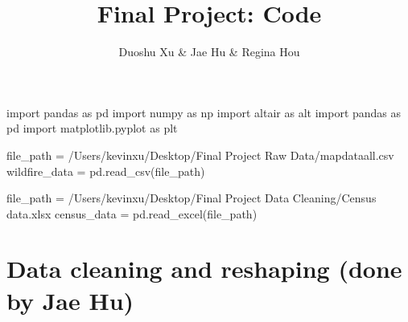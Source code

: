 \documentclass[
  letterpaper,
  DIV=11,
  numbers=noendperiod]{scrartcl}
\title{Final Project: Code}
\author{Duoshu Xu \& Jae Hu \& Regina Hou}
\date{}
\newenvironment{Shaded}{\begin{snugshade}}{\end{snugshade}}
\newcommand{\ImportTok}[1]{\textcolor[rgb]{0.00,0.46,0.62}{#1}}
\newcommand{\NormalTok}[1]{\textcolor[rgb]{0.00,0.23,0.31}{#1}}
\newcommand{\OperatorTok}[1]{\textcolor[rgb]{0.37,0.37,0.37}{#1}}
\newcommand{\StringTok}[1]{\textcolor[rgb]{0.13,0.47,0.30}{#1}}
\begin{document}
\maketitle



\begin{Shaded}
\begin{Highlighting}[]
\ImportTok{import}\NormalTok{ pandas }\ImportTok{as}\NormalTok{ pd}
\ImportTok{import}\NormalTok{ numpy }\ImportTok{as}\NormalTok{ np}
\ImportTok{import}\NormalTok{ altair }\ImportTok{as}\NormalTok{ alt}
\ImportTok{import}\NormalTok{ pandas }\ImportTok{as}\NormalTok{ pd}
\ImportTok{import}\NormalTok{ matplotlib.pyplot }\ImportTok{as}\NormalTok{ plt}
\end{Highlighting}
\end{Shaded}

\begin{Shaded}
\begin{Highlighting}[]
\NormalTok{file\_path }\OperatorTok{=} \StringTok{\textquotesingle{}/Users/kevinxu/Desktop/Final Project Raw Data/mapdataall.csv\textquotesingle{}}
\NormalTok{wildfire\_data }\OperatorTok{=}\NormalTok{ pd.read\_csv(file\_path)}
\end{Highlighting}
\end{Shaded}

\begin{Shaded}
\begin{Highlighting}[]
\NormalTok{file\_path }\OperatorTok{=} \StringTok{\textquotesingle{}/Users/kevinxu/Desktop/Final Project Data Cleaning/Census data.xlsx\textquotesingle{}}
\NormalTok{census\_data }\OperatorTok{=}\NormalTok{ pd.read\_excel(file\_path)}
\end{Highlighting}
\end{Shaded}

\section{Data cleaning and reshaping (done by Jae
Hu)}\label{data-cleaning-and-reshaping-done-by-jae-hu}
\end{document}
